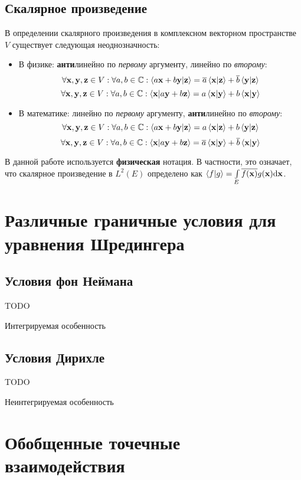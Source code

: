 \subsection{Скалярное произведение}
В определении скалярного произведения в комплексном векторном пространстве $V$ существует следующая неоднозначность:

\begin{itemize}
\item В физике: \textbf{анти}линейно по \textit{первому} аргументу, линейно по \textit{второму}:
\[
\forall \vb{x}, \vb{y}, \vb{z} \in V: \forall a, b \in \mathbb{C}: \ip{a\vb{x} + b\vb{y}}{\vb{z}} = \cconj{a} \ip{\vb{x}}{\vb{z}} + \cconj{b} \ip{\vb{y}}{\vb{z}}
\]
\[
\forall \vb{x}, \vb{y}, \vb{z} \in V: \forall a, b \in \mathbb{C}: \ip{\vb{x}}{a\vb{y} + b\vb{z}} = a \ip{\vb{x}}{\vb{y}} + b \ip{\vb{x}}{\vb{y}}
\]
\item В математике: линейно по \textit{первому} аргументу, \textbf{анти}линейно по \textit{второму}:
\[
\forall \vb{x}, \vb{y}, \vb{z} \in V: \forall a, b \in \mathbb{C}: \ip{a\vb{x} + b\vb{y}}{\vb{z}} = a \ip{\vb{x}}{\vb{z}} + b \ip{\vb{y}}{\vb{z}}
\]
\[
\forall \vb{x}, \vb{y}, \vb{z} \in V: \forall a, b \in \mathbb{C}: \ip{\vb{x}}{a\vb{y} + b\vb{z}} = \cconj{a} \ip{\vb{x}}{\vb{y}} + \cconj{b} \ip{\vb{x}}{\vb{y}}
\]
\end{itemize}

В данной работе используется \textbf{физическая} нотация. В частности, это означает, что скалярное произведение в $L^2(E)$ определено как $\ip{f}{g} = \int\limits_E \cconj{f(\vb{x})} g(\vb{x}) \dd \vb{x}$.

\section{Различные граничные условия для уравнения Шредингера}

\subsection{Условия фон Неймана}
TODO

Интегрируемая особенность
\subsection{Условия Дирихле}
TODO

Неинтегрируемая особенность

\section{Обобщенные точечные взаимодействия}

